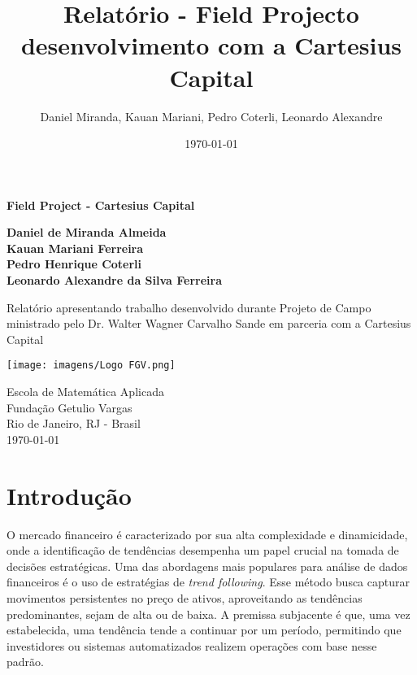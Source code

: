 \documentclass{article}
\title{Relatório - Field Projecto desenvolvimento com a Cartesius Capital}
\author{Daniel Miranda, Kauan Mariani, Pedro Coterli, Leonardo Alexandre}
\date{\today}
\begin{document}
\begin{titlepage}
    \begin{center}            
        \Huge
        \textbf{Field Project - Cartesius Capital}
            
        \vspace{0.5cm}
        \LARGE
            
        \vspace{3.0cm}

        \textbf{Daniel de Miranda Almeida}\\
        \textbf{Kauan Mariani Ferreira}\\
        \textbf{Pedro Henrique Coterli}\\
        \textbf{Leonardo Alexandre da Silva Ferreira}

        \vspace{3.0cm}
            
            
        Relatório apresentando trabalho desenvolvido durante Projeto de Campo ministrado pelo Dr. Walter Wagner Carvalho Sande em parceria com a Cartesius Capital
            
        \vspace{1.0cm}
            
        \texttt{[image: imagens/Logo FGV.png]}
            
        \Large
        Escola de Matemática Aplicada\\
        Fundação Getulio Vargas\\
        Rio de Janeiro, RJ - Brasil\\
        \today
            
    \end{center}
\end{titlepage}
\newpage

\tableofcontents
\newpage

\section{Introdução}

O mercado financeiro é caracterizado por sua alta complexidade e dinamicidade, onde a identificação de tendências desempenha um papel crucial na tomada de decisões estratégicas. Uma das abordagens mais populares para análise de dados financeiros é o uso de estratégias de \textit{trend following}. Esse método busca capturar movimentos persistentes no preço de ativos, aproveitando as tendências predominantes, sejam de alta ou de baixa. A premissa subjacente é que, uma vez estabelecida, uma tendência tende a continuar por um período, permitindo que investidores ou sistemas automatizados realizem operações com base nesse padrão.
\end{document}
